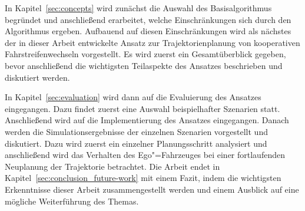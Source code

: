 In Kapitel~\ref{sec:concepts} wird zun\"achst die Auswahl des Basisalgorithmus begr\"undet und anschlie{\ss}end erarbeitet, welche Einschr\"ankungen sich durch den Algorithmus ergeben.
Aufbauend auf diesen Einschr\"ankungen wird als n\"achstes der in dieser Arbeit entwickelte Ansatz zur Trajektorienplanung von kooperativen Fahrstreifenwechseln vorgestellt.
Es wird zuerst ein Gesamt\"uberblick gegeben, bevor anschlie{\ss}end die wichtigsten Teilaspekte des Ansatzes beschrieben und diskutiert werden.

In Kapitel~\ref{sec:evaluation} wird dann auf die Evaluierung des Ansatzes eingegangen. 
Dazu findet zuerst eine Auswahl beispielhafter Szenarien statt.
Anschlie{\ss}end wird auf die Implementierung des Ansatzes eingegangen.
Danach werden die Simulationsergebnisse der einzelnen Szenarien vorgestellt und diskutiert.
Dazu wird zuerst ein einzelner Planungsschritt analysiert und anschlie{\ss}end wird das Verhalten des Ego"=Fahrzeuges bei einer fortlaufenden Neuplanung der Trajektorie betrachtet.
Die Arbeit endet in Kapitel~\ref{sec:conclusion_future-work} mit einem Fazit, indem die wichtigsten Erkenntnisse dieser Arbeit zusammengestellt werden und einem Ausblick auf eine m\"ogliche Weiterf\"uhrung des Themas.


